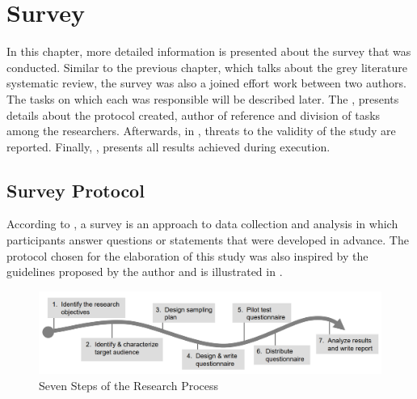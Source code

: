 
\chapter{Survey}\label{survey}

In this chapter, more detailed information is presented about the survey that was conducted. Similar to the previous chapter, which talks about the grey literature systematic review, the survey was also a joined effort work between two authors. The tasks on which each was responsible will be described later. The , presents details about the protocol created, author of reference and division of tasks among the researchers. Afterwards, in , threats to the validity of the study are reported. Finally, , presents all results achieved during execution.

\section{Survey Protocol}\label{sec:survey-protocol}

According to , a survey is an approach to data collection and analysis in which participants answer questions or statements that were developed in advance. The protocol chosen for the elaboration of this study was also inspired by the guidelines proposed by the author and is illustrated in .

\begin{figure}[!htb]
  \caption{Seven Steps of the Research Process}\label{fig:setepassos}
  \begin{center}
    \includegraphics[width=16cm]{img/5-kasunic-process.png}
  \end{center}
\end{figure}

